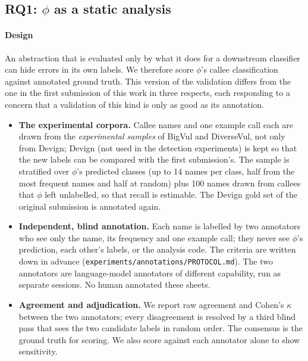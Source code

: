 \subsection{RQ1: $\phi$ as a static analysis}
\label{sec:rq_analysis}

\paragraph{Design} An abstraction that is evaluated only by what it does for a
downstream classifier can hide errors in its own labels. We therefore score
$\phi$'s callee classification against annotated ground truth. This version of
the validation differs from the one in the first submission of this work in
three respects, each responding to a concern that a validation of this kind is
only as good as its annotation.

\begin{itemize}
    \item \textbf{The experimental corpora.} Callee names and one
          example call each are drawn from the \emph{experimental samples} of
          BigVul and DiverseVul, not only from Devign; Devign (not used in the
          detection experiments) is kept so that the new labels can be compared
          with the first submission's. The sample is stratified
          over $\phi$'s predicted classes (up to 14 names per class, half from
          the most frequent names and half at random) plus 100 names drawn
          from callees that $\phi$ left unlabelled, so that recall is
          estimable. The Devign gold set of the original submission is
          annotated again.
    \item \textbf{Independent, blind annotation.} Each name is labelled by two
          annotators who see only the name, its frequency and one example call;
          they never see $\phi$'s prediction, each other's labels, or the
          analysis code. The criteria are written down in advance
          (\texttt{experiments/annotations/PROTOCOL.md}). The two annotators
          are language-model annotators of different capability, run as
          separate sessions. No human annotated these sheets.
    \item \textbf{Agreement and adjudication.} We report raw agreement and
          Cohen's $\kappa$~\cite{cohen1960coefficient} between the two annotators; every disagreement is
          resolved by a third blind pass that sees the two candidate labels in
          random order. The consensus is the ground truth for scoring. We also
          score against each annotator alone to show sensitivity.
\end{itemize}

